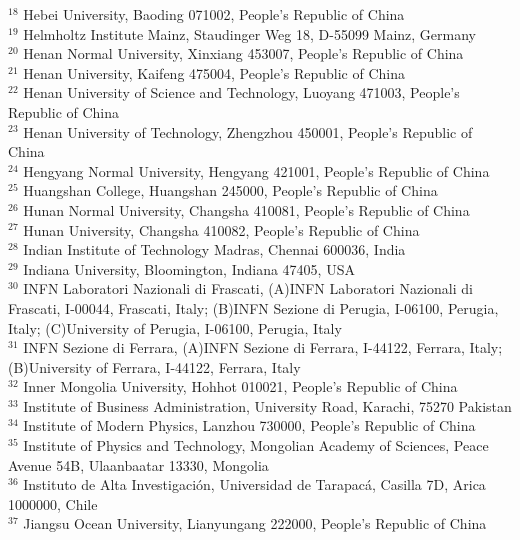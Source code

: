 {{$^{18}$ Hebei University, Baoding 071002, People's Republic of China\\
$^{19}$ Helmholtz Institute Mainz, Staudinger Weg 18, D-55099 Mainz, Germany\\
$^{20}$ Henan Normal University, Xinxiang 453007, People's Republic of China\\
$^{21}$ Henan University, Kaifeng 475004, People's Republic of China\\
$^{22}$ Henan University of Science and Technology, Luoyang 471003, People's Republic of China\\
$^{23}$ Henan University of Technology, Zhengzhou 450001, People's Republic of China\\
$^{24}$ Hengyang Normal University, Hengyang 421001, People's Republic of China\\
$^{25}$ Huangshan College, Huangshan 245000, People's Republic of China\\
$^{26}$ Hunan Normal University, Changsha 410081, People's Republic of China\\
$^{27}$ Hunan University, Changsha 410082, People's Republic of China\\
$^{28}$ Indian Institute of Technology Madras, Chennai 600036, India\\
$^{29}$ Indiana University, Bloomington, Indiana 47405, USA\\
$^{30}$ INFN Laboratori Nazionali di Frascati, (A)INFN Laboratori Nazionali di Frascati, I-00044, Frascati, Italy; (B)INFN Sezione di Perugia, I-06100, Perugia, Italy; (C)University of Perugia, I-06100, Perugia, Italy\\
$^{31}$ INFN Sezione di Ferrara, (A)INFN Sezione di Ferrara, I-44122, Ferrara, Italy; (B)University of Ferrara, I-44122, Ferrara, Italy\\
$^{32}$ Inner Mongolia University, Hohhot 010021, People's Republic of China\\
$^{33}$ Institute of Business Administration, University Road, Karachi, 75270 Pakistan\\
$^{34}$ Institute of Modern Physics, Lanzhou 730000, People's Republic of China\\
$^{35}$ Institute of Physics and Technology, Mongolian Academy of Sciences, Peace Avenue 54B, Ulaanbaatar 13330, Mongolia\\
$^{36}$ Instituto de Alta Investigaci\'on, Universidad de Tarapac\'a, Casilla 7D, Arica 1000000, Chile\\
$^{37}$ Jiangsu Ocean University, Lianyungang 222000, People's Republic of China\\
}}
